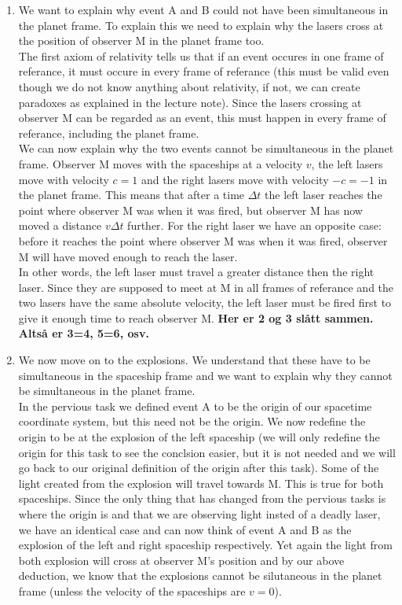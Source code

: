 \documentclass[a4paper,10pt,english]{article}
\begin{document}
\begin{enumerate}
\item We want to explain why event A and B could not have been simultaneous in the planet frame. To explain this we need to explain why the lasers cross at the position of observer M in the planet frame too. 
\\
The first axiom of relativity tells us that if an event occures in one frame of referance, it must occure in every frame of referance (this must be valid even though we do not know anything about relativity, if not, we can create paradoxes as explained in the lecture note). Since the lasers crossing at observer M can be regarded as an event, this must happen in every frame of referance, including the planet frame. 
\\
We can now explain why the two events cannot be simultaneous in the planet frame. Observer M moves with the spaceships at a velocity $v$, the left lasers move with velocity $c=1$ and the right lasers move with velocity $-c=-1$ in the planet frame. This means that after a time $\Delta t$ the left laser reaches the point where observer M was when it was fired, but observer M has now moved a distance $v\Delta t$ further. For the right laser we have an opposite case: before it reaches the point where observer M was when it was fired, observer M will have moved enough to reach the laser.
\\
In other words, the left laser must travel a greater distance then the right laser. Since they are supposed to meet at M in all frames of referance and the two lasers have the same absolute velocity, the left laser must be fired first to give it enough time to reach observer M.
\textbf{Her er 2 og 3 slått sammen. Altså er 3=4, 5=6, osv.}

\item We now move on to the explosions. We understand that these have to be simultaneous in the spaceship frame and we want to explain why they cannot be simultaneous in the planet frame.
\\
In the pervious task we defined event A to be the origin of our spacetime coordinate system, but this need not be the origin. We now redefine the origin to be at the explosion of the left spaceship (we will only redefine the origin for this task to see the conclsion easier, but it is not needed and we will go back to our original definition of the origin after this task). Some of the light created from the explosion will travel towards M. This is true for both spaceships. Since the only thing that has changed from the pervious tasks is where the origin is and that we are observing light insted of a deadly laser, we have an identical case and can now think of event A and B as the explosion of the left and right spaceship respectively. Yet again the light from both explosion will cross at observer M's position and by our above deduction, we know that the explosions cannot be silutaneous in the planet frame (unless the velocity of the spaceships are $v=0$).


\end{enumerate}
\end{document}
